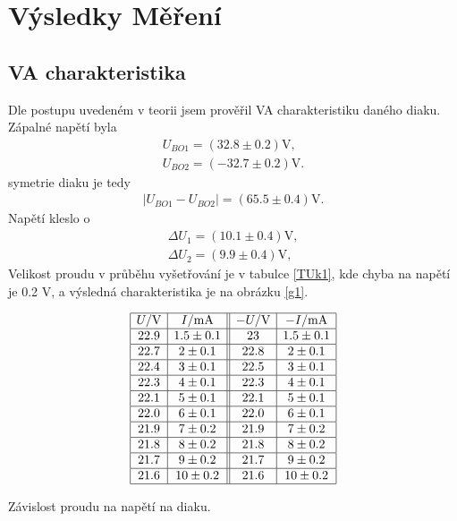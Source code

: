 \documentclass[a4paper,12pt]{article}
\begin{document}
\section{Výsledky Měření}
\subsection{VA charakteristika}
    Dle postupu uvedeném v teorii jsem prověřil VA charakteristiku daného diaku. Zápalné napětí byla
    \begin{eqnarray}
        U_{BO1}=(32.8\pm0.2)\mbox{V}, \label{UBO1} \\
        U_{BO2}=(-32.7\pm0.2)\mbox{V}.
    \end{eqnarray}
    symetrie diaku je tedy
    \begin{eqnarray}
    |U_{BO1}-U_{BO2}|=(65.5 \pm 0.4)\mbox{V}.
    \end{eqnarray}
    Napětí kleslo o 
    \begin{eqnarray}
    \Delta U_1=(10.1 \pm 0.4)\mbox{V}, \\
    \Delta U_2=(9.9 \pm 0.4)\mbox{V}, \label{DU2}
    \end{eqnarray}
    Velikost proudu v průběhu vyšetřování je v tabulce \ref{TUk1}, kde chyba na napětí je 0.2 V, a výsledná charakteristika je na obrázku \ref{g1}.

    \begin{table}
    $$
    \begin{array}{|c|c||c|c|}
    \hline
    U/\mbox{V} & I/\mbox{mA} &  -U/\mbox{V} & -I/\mbox{mA} \\ \hline 
    22.9&   1.5 \pm 0.1&    23&  1.5\pm0.1 \\ \hline
    22.7&   2 \pm 0.1&  22.8&   2\pm 0.1 \\ \hline
    22.4&   3 \pm 0.1&  22.5&   3\pm0.1 \\ \hline
    22.3&   4 \pm 0.1&  22.3&   4\pm 0.1 \\ \hline
    22.1&   5 \pm 0.1&  22.1&   5\pm0.1 \\ \hline
    22.0&   6 \pm 0.1&  22.0&   6\pm0.1 \\ \hline
    21.9&   7 \pm 0.2& 21.9&   7\pm0.2 \\ \hline
    21.8&   8 \pm 0.2& 21.8&   8 \pm 0.2 \\ \hline
    21.7&   9 \pm 0.2& 21.7&   9 \pm 0.2 \\ \hline
    21.6&   10 \pm 0.2&21.6&   10 \pm 0.2 \\ \hline
    \end{array}
    $$
    \caption{Závislost proudu na napětí na diaku.}
    \label{TUk1}
    \end{table}
    
\end{document}

